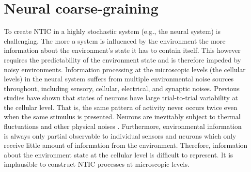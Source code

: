 \documentclass[utf8]{article}
\begin{document}

			


	\section{Neural coarse-graining}

		To create NTIC in a highly stochastic system (e.g., the neural system) is challenging. The more a system is influenced by the environment the more information about the environment's state it has to contain itself. This however requires the predictability of the environment state and is therefore impeded by noisy environments.  Information processing at the microscopic levels (the cellular levels) in the neural system suffers from multiple environmental noise sources throughout, including sensory, cellular, electrical, and synaptic noises. Previous studies have shown that states of neurons have large trial-to-trial variability at the cellular level. That is, the same pattern of activity never occurs twice even when the same stimulus is presented. Neurons are inevitably subject to thermal fluctuations and other physical noises \citep{faisal2008noise}. Furthermore, environmental information is always only partial observable to individual sensors and neurons which only receive little amount of information from the environment. Therefore, information about the environment state at the cellular level is difficult to represent. It is implausible to construct NTIC processes at microscopic levels.
\end{document}
